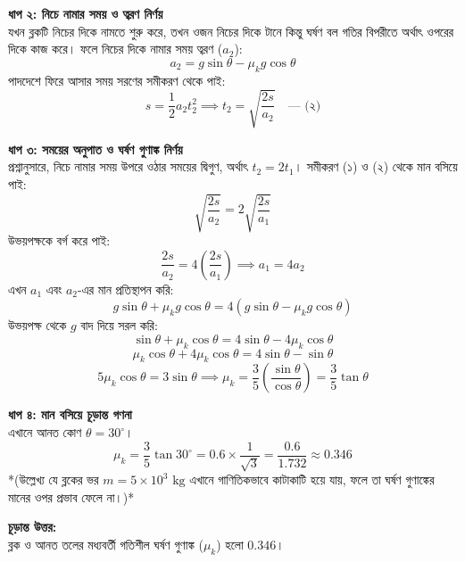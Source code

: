 \documentclass[12pt, a4paper]{article}
\begin{document}
\begin{tcolorbox}[solutionbox={সমাধান (Solution)}]
\begin{center}
\end{center}
\vspace{1em}

\noindent
\textbf{ধাপ ২: নিচে নামার সময় ও ত্বরণ নির্ণয়} \\
যখন ব্লকটি নিচের দিকে নামতে শুরু করে, তখন ওজন নিচের দিকে টানে কিন্তু ঘর্ষণ বল গতির বিপরীতে অর্থাৎ ওপরের দিকে কাজ করে। ফলে নিচের দিকে নামার সময় ত্বরণ ($a_2$):
\[ a_2 = g\sin\theta - \mu_k g\cos\theta \]
পাদদেশে ফিরে আসার সময় সরণের সমীকরণ থেকে পাই:
\[ s = \frac{1}{2} a_2 t_2^2 \implies t_2 = \sqrt{\frac{2s}{a_2}} \quad \text{--- (২)} \]

\vspace{0.5em}
\noindent
\textbf{ধাপ ৩: সময়ের অনুপাত ও ঘর্ষণ গুণাঙ্ক নির্ণয়} \\
প্রশ্নানুসারে, নিচে নামার সময় উপরে ওঠার সময়ের দ্বিগুণ, অর্থাৎ $t_2 = 2 t_1$।
সমীকরণ (১) ও (২) থেকে মান বসিয়ে পাই:
\[ \sqrt{\frac{2s}{a_2}} = 2 \sqrt{\frac{2s}{a_1}} \]
উভয়পক্ষকে বর্গ করে পাই:
\[ \frac{2s}{a_2} = 4 \left(\frac{2s}{a_1}\right) \implies a_1 = 4 a_2 \]
এখন $a_1$ এবং $a_2$-এর মান প্রতিস্থাপন করি:
\[ g\sin\theta + \mu_k g\cos\theta = 4(g\sin\theta - \mu_k g\cos\theta) \]
উভয়পক্ষ থেকে $g$ বাদ দিয়ে সরল করি:
\[ \sin\theta + \mu_k \cos\theta = 4\sin\theta - 4\mu_k \cos\theta \]
\[ \mu_k \cos\theta + 4\mu_k \cos\theta = 4\sin\theta - \sin\theta \]
\[ 5\mu_k \cos\theta = 3\sin\theta \implies \mu_k = \frac{3}{5} \left(\frac{\sin\theta}{\cos\theta}\right) = \frac{3}{5}\tan\theta \]

\vspace{0.5em}
\noindent
\textbf{ধাপ ৪: মান বসিয়ে চূড়ান্ত গণনা} \\
এখানে আনত কোণ $\theta = 30^\circ$।
\[ \mu_k = \frac{3}{5} \tan 30^\circ = 0.6 \times \frac{1}{\sqrt{3}} = \frac{0.6}{1.732} \approx \mathbf{0.346} \]
*(উল্লেখ্য যে ব্লকের ভর $m = 5 \times 10^3\text{ kg}$ এখানে গাণিতিকভাবে কাটাকাটি হয়ে যায়, ফলে তা ঘর্ষণ গুণাঙ্কের মানের ওপর প্রভাব ফেলে না।)*

\vspace{1em}
\begin{tcolorbox}[answerbox]
\textbf{চূড়ান্ত উত্তর:} \\
ব্লক ও আনত তলের মধ্যবর্তী গতিশীল ঘর্ষণ গুণাঙ্ক ($\mu_k$) হলো $\mathbf{0.346}$।
\end{tcolorbox}
\end{tcolorbox}
\end{document}
